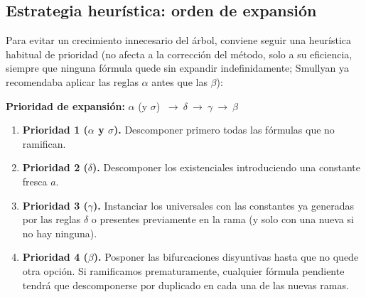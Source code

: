 \subsection{Estrategia heurística: orden de expansión}

Para evitar un crecimiento innecesario del árbol, conviene seguir una heurística habitual de prioridad (no afecta a la corrección del método, solo a su eficiencia, siempre que ninguna fórmula quede sin expandir indefinidamente; Smullyan ya recomendaba aplicar las reglas $\alpha$ antes que las $\beta$):
\begin{center}
\textbf{Prioridad de expansión: } $\alpha$ (y $\sigma$) $\ \longrightarrow \ \delta \ \longrightarrow \ \gamma \ \longrightarrow \ \beta$
\end{center}
\begin{enumerate}
    \item \textbf{Prioridad 1 ($\alpha$ y $\sigma$).} Descomponer primero todas las fórmulas que no ramifican. 
    \item \textbf{Prioridad 2 ($\delta$).} Descomponer los existenciales introduciendo una constante fresca $a$.
    \item \textbf{Prioridad 3 ($\gamma$).} Instanciar los universales con las constantes ya generadas por las reglas $\delta$ o presentes previamente en la rama (y solo con una nueva si no hay ninguna).
    \item \textbf{Prioridad 4 ($\beta$).} Posponer las bifurcaciones disyuntivas hasta que no quede otra opción. Si ramificamos prematuramente, cualquier fórmula pendiente tendrá que descomponerse por duplicado en cada una de las nuevas ramas.
\end{enumerate}

